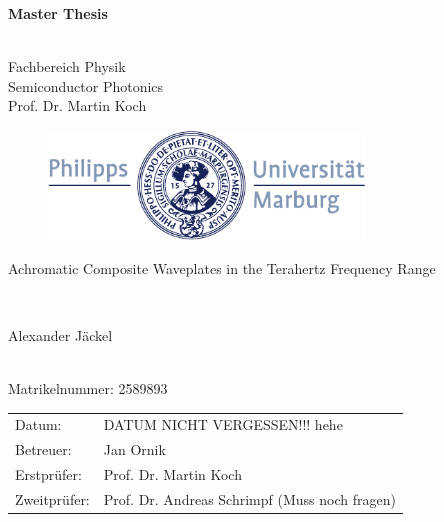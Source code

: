 \documentclass[12pt, a4paper]{report}
\begin{document}
\begin{titlepage}
  \vspace{3cm}
  \thispagestyle{empty}
  \begin{center}
    \begin{LARGE}
      \textbf{Master Thesis}
    \end{LARGE}\\
    Fachbereich Physik \\
    Semiconductor Photonics \\
    Prof. Dr. Martin Koch
    \\[1cm]
    \begin{figure}[h]
    \hspace{0.8cm}
      \centering
      \includegraphics[width=0.75\textwidth]{images/title_logo.pdf}
    \end{figure}
    \vspace{2cm}
    \begin{LARGE}
      Achromatic Composite Waveplates in the Terahertz Frequency Range
    \end{LARGE}\\[2cm]
    \begin{LARGE}
      Alexander Jäckel
    \end{LARGE}
    \\
    Matrikelnummer: 2589893
  \end{center}
  \vfill
    \noindent\begin{tabular}{ll}
      Datum: & DATUM NICHT VERGESSEN!!! hehe \\
      Betreuer: & Jan Ornik \\
      Erstprüfer: & Prof. Dr. Martin Koch \\
      Zweitprüfer: & Prof. Dr. Andreas Schrimpf (Muss noch fragen)  \\
    \end{tabular}
\end{titlepage}
\end{document}
